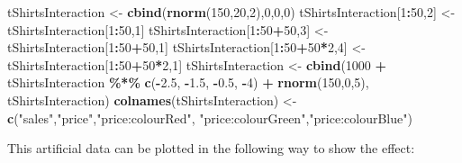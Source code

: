 \documentclass[
]{book}
\newenvironment{Shaded}{\begin{snugshade}}{\end{snugshade}}
\newcommand{\DecValTok}[1]{\textcolor[rgb]{0.00,0.00,0.81}{#1}}
\newcommand{\FloatTok}[1]{\textcolor[rgb]{0.00,0.00,0.81}{#1}}
\newcommand{\FunctionTok}[1]{\textcolor[rgb]{0.13,0.29,0.53}{\textbf{#1}}}
\newcommand{\NormalTok}[1]{#1}
\newcommand{\OtherTok}[1]{\textcolor[rgb]{0.56,0.35,0.01}{#1}}
\newcommand{\SpecialCharTok}[1]{\textcolor[rgb]{0.81,0.36,0.00}{\textbf{#1}}}
\newcommand{\StringTok}[1]{\textcolor[rgb]{0.31,0.60,0.02}{#1}}
\theoremstyle{definition}
\theoremstyle{definition}
\theoremstyle{definition}
\theoremstyle{definition}
\theoremstyle{remark}
\begin{document}
\begin{Shaded}
\begin{Highlighting}[]
\NormalTok{tShirtsInteraction }\OtherTok{\textless{}{-}} \FunctionTok{cbind}\NormalTok{(}\FunctionTok{rnorm}\NormalTok{(}\DecValTok{150}\NormalTok{,}\DecValTok{20}\NormalTok{,}\DecValTok{2}\NormalTok{),}\DecValTok{0}\NormalTok{,}\DecValTok{0}\NormalTok{,}\DecValTok{0}\NormalTok{)}
\NormalTok{tShirtsInteraction[}\DecValTok{1}\SpecialCharTok{:}\DecValTok{50}\NormalTok{,}\DecValTok{2}\NormalTok{] }\OtherTok{\textless{}{-}}\NormalTok{ tShirtsInteraction[}\DecValTok{1}\SpecialCharTok{:}\DecValTok{50}\NormalTok{,}\DecValTok{1}\NormalTok{]}
\NormalTok{tShirtsInteraction[}\DecValTok{1}\SpecialCharTok{:}\DecValTok{50}\SpecialCharTok{+}\DecValTok{50}\NormalTok{,}\DecValTok{3}\NormalTok{] }\OtherTok{\textless{}{-}}\NormalTok{ tShirtsInteraction[}\DecValTok{1}\SpecialCharTok{:}\DecValTok{50}\SpecialCharTok{+}\DecValTok{50}\NormalTok{,}\DecValTok{1}\NormalTok{]}
\NormalTok{tShirtsInteraction[}\DecValTok{1}\SpecialCharTok{:}\DecValTok{50}\SpecialCharTok{+}\DecValTok{50}\SpecialCharTok{*}\DecValTok{2}\NormalTok{,}\DecValTok{4}\NormalTok{] }\OtherTok{\textless{}{-}}\NormalTok{ tShirtsInteraction[}\DecValTok{1}\SpecialCharTok{:}\DecValTok{50}\SpecialCharTok{+}\DecValTok{50}\SpecialCharTok{*}\DecValTok{2}\NormalTok{,}\DecValTok{1}\NormalTok{]}
\NormalTok{tShirtsInteraction }\OtherTok{\textless{}{-}} \FunctionTok{cbind}\NormalTok{(}\DecValTok{1000} \SpecialCharTok{+}\NormalTok{ tShirtsInteraction }\SpecialCharTok{\%*\%} \FunctionTok{c}\NormalTok{(}\SpecialCharTok{{-}}\FloatTok{2.5}\NormalTok{, }\SpecialCharTok{{-}}\FloatTok{1.5}\NormalTok{, }\SpecialCharTok{{-}}\FloatTok{0.5}\NormalTok{, }\SpecialCharTok{{-}}\DecValTok{4}\NormalTok{) }\SpecialCharTok{+}
                              \FunctionTok{rnorm}\NormalTok{(}\DecValTok{150}\NormalTok{,}\DecValTok{0}\NormalTok{,}\DecValTok{5}\NormalTok{), tShirtsInteraction)}
\FunctionTok{colnames}\NormalTok{(tShirtsInteraction) }\OtherTok{\textless{}{-}} \FunctionTok{c}\NormalTok{(}\StringTok{"sales"}\NormalTok{,}\StringTok{"price"}\NormalTok{,}\StringTok{"price:colourRed"}\NormalTok{,}
                                  \StringTok{"price:colourGreen"}\NormalTok{,}\StringTok{"price:colourBlue"}\NormalTok{)}
\end{Highlighting}
\end{Shaded}

This artificial data can be plotted in the following way to show the effect:
\end{document}
